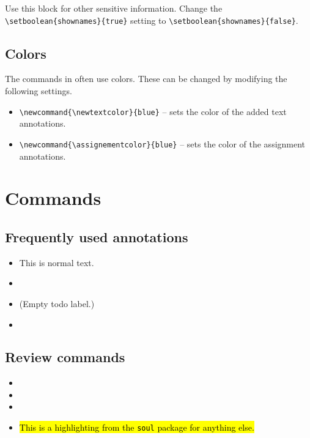 \documentclass{article}
\begin{document}
Use this block for other sensitive information. Change the \verb|\setboolean{shownames}{true}| setting to \verb|\setboolean{shownames}{false}|.

\subsection{Colors}

The commands in  often use colors. These can be changed by modifying the following settings.
\begin{itemize}
    \item \verb|\newcommand{\newtextcolor}{blue}| -- sets the color of the added text annotations.
    \item \verb|\newcommand{\assignementcolor}{blue}| -- sets the color of the assignment annotations.
\end{itemize}





\section{Commands}\label{sec:commands}

\subsection{Frequently used annotations}

\begin{itemize}
    \item This is normal text.
    \item {}
    \item \todo{} (Empty todo label.)
    \item {}
\end{itemize}

\subsection{Review commands}

\begin{itemize}
    \item {}
    \item {}
    \item {}
    \item \hl{This is a highlighting from the \texttt{soul} package for anything else.}
\end{itemize}
\end{document}
